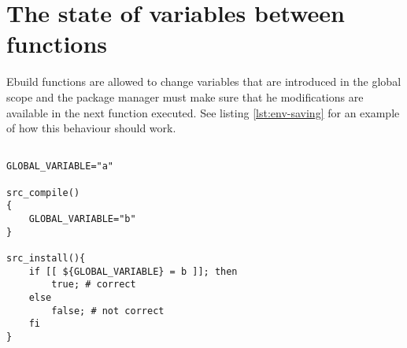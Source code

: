 \section{The state of variables between functions}
\label{ebuild-env-state}

Ebuild functions are allowed to change variables that are introduced in the global scope
and the package manager must make sure that he modifications are available in the next
function executed. See listing \ref{lst:env-saving} for an example of how this behaviour should
work.

\begin{lstlisting}[float,caption=Environment state between functions,label=lst:env-saving]

GLOBAL_VARIABLE="a"

src_compile()
{
    GLOBAL_VARIABLE="b"
}

src_install(){
    if [[ ${GLOBAL_VARIABLE} = b ]]; then
        true; # correct
    else
        false; # not correct
    fi
}
\end{lstlisting}


